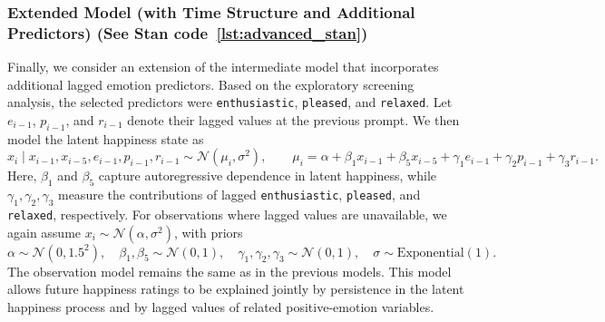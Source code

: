 \documentclass[12pt,letterpaper,fleqn]{article}
\begin{document}

\subsubsection{Extended Model (with Time Structure and Additional Predictors) (See Stan code~\ref{lst:advanced_stan})}

Finally, we consider an extension of the intermediate model that incorporates additional lagged emotion predictors. Based on the exploratory screening analysis, the selected predictors were \texttt{enthusiastic}, \texttt{pleased}, and \texttt{relaxed}. Let \(e_{i-1}\), \(p_{i-1}\), and \(r_{i-1}\) denote their lagged values at the previous prompt. We then model the latent happiness state as
\[
x_i \mid x_{i-1},x_{i-5},e_{i-1},p_{i-1},r_{i-1}
\sim \mathcal{N}(\mu_i,\sigma^2),
\qquad
\mu_i
=
\alpha
+\beta_1 x_{i-1}
+\beta_5 x_{i-5}
+\gamma_1 e_{i-1}
+\gamma_2 p_{i-1}
+\gamma_3 r_{i-1}.
\]
Here, \(\beta_1\) and \(\beta_5\) capture autoregressive dependence in latent happiness, while \(\gamma_1,\gamma_2,\gamma_3\) measure the contributions of lagged \texttt{enthusiastic}, \texttt{pleased}, and \texttt{relaxed}, respectively. For observations where lagged values are unavailable, we again assume \(x_i \sim \mathcal{N}(\alpha,\sigma^2)\), with priors
\[
\alpha \sim \mathcal{N}(0,1.5^2),\quad
\beta_1,\beta_5 \sim \mathcal{N}(0,1),\quad
\gamma_1,\gamma_2,\gamma_3 \sim \mathcal{N}(0,1),\quad
\sigma \sim \mathrm{Exponential}(1).
\]
The observation model remains the same as in the previous models. This model allows future happiness ratings to be explained jointly by persistence in the latent happiness process and by lagged values of related positive-emotion variables.
\end{document}

